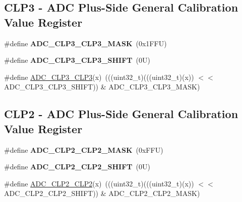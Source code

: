 \subsection*{C\+L\+P3 -\/ A\+DC Plus-\/\+Side General Calibration Value Register}
\begin{DoxyCompactItemize}
\item 
\mbox{\label{group___a_d_c___register___masks_gaeae73e0daf3e9a9174024850a719768d}} 
\#define {\bfseries A\+D\+C\+\_\+\+C\+L\+P3\+\_\+\+C\+L\+P3\+\_\+\+M\+A\+SK}~(0x1\+F\+F\+U)
\item 
\mbox{\label{group___a_d_c___register___masks_ga9eef257b72d4181481aa5e3bf0a85732}} 
\#define {\bfseries A\+D\+C\+\_\+\+C\+L\+P3\+\_\+\+C\+L\+P3\+\_\+\+S\+H\+I\+FT}~(0\+U)
\item 
\#define \mbox{\hyperlink{group___a_d_c___register___masks_ga3f0884b7fa6046cdcb1cce1eb2511baf}{A\+D\+C\+\_\+\+C\+L\+P3\+\_\+\+C\+L\+P3}}(x)~(((uint32\+\_\+t)(((uint32\+\_\+t)(x)) $<$$<$ A\+D\+C\+\_\+\+C\+L\+P3\+\_\+\+C\+L\+P3\+\_\+\+S\+H\+I\+FT)) \& A\+D\+C\+\_\+\+C\+L\+P3\+\_\+\+C\+L\+P3\+\_\+\+M\+A\+SK)
\end{DoxyCompactItemize}
\subsection*{C\+L\+P2 -\/ A\+DC Plus-\/\+Side General Calibration Value Register}
\begin{DoxyCompactItemize}
\item 
\mbox{\label{group___a_d_c___register___masks_ga2d10a369ac0c13f4ee3535e9f45a5d17}} 
\#define {\bfseries A\+D\+C\+\_\+\+C\+L\+P2\+\_\+\+C\+L\+P2\+\_\+\+M\+A\+SK}~(0x\+F\+F\+U)
\item 
\mbox{\label{group___a_d_c___register___masks_ga071963a7a6ff4f1b72c79c66aee09043}} 
\#define {\bfseries A\+D\+C\+\_\+\+C\+L\+P2\+\_\+\+C\+L\+P2\+\_\+\+S\+H\+I\+FT}~(0\+U)
\item 
\#define \mbox{\hyperlink{group___a_d_c___register___masks_ga9b88c4499b2da56a5919cb15dcdc5dab}{A\+D\+C\+\_\+\+C\+L\+P2\+\_\+\+C\+L\+P2}}(x)~(((uint32\+\_\+t)(((uint32\+\_\+t)(x)) $<$$<$ A\+D\+C\+\_\+\+C\+L\+P2\+\_\+\+C\+L\+P2\+\_\+\+S\+H\+I\+FT)) \& A\+D\+C\+\_\+\+C\+L\+P2\+\_\+\+C\+L\+P2\+\_\+\+M\+A\+SK)
\end{DoxyCompactItemize}
